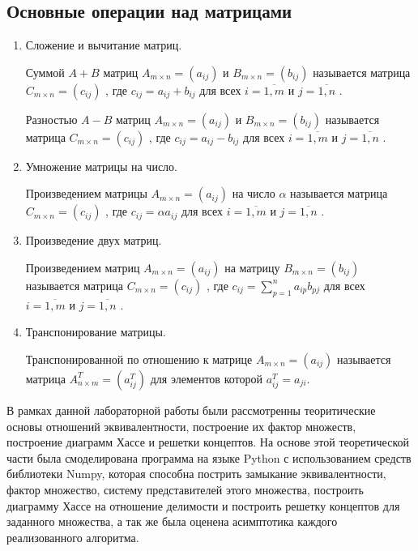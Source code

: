 \documentclass[spec, och, labwork]{shiza}
\begin{document}
    \subsection{Основные операции над матрицами}

    \begin{enumerate}
        \item Сложение и вычитание матриц.
        
        Суммой $A + B$ матриц $A_{m \times n} = (a_{ij}) \text{ и }B_{m \times n} = (b_{ij})$ называется матрица 
        $C_{m \times n} = (c_{ij})$ , где $c_{ij} = a_{ij} + b_{ij}$ для всех $i = \overline{1, m} \text{ и } j = \overline{1, n}$ .

        Разностью $A - B$ матриц $A_{m \times n} = (a_{ij}) \text{ и }B_{m \times n} = (b_{ij})$ называется матрица 
        $C_{m \times n} = (c_{ij})$ , где $c_{ij} = a_{ij} - b_{ij}$ для всех $i = \overline{1, m} \text{ и } j = \overline{1, n}$ .
        \item Умножение матрицы на число.
        
        Произведением матрицы $A_{m \times n} = (a_{ij}) \text{ на число } \alpha$ называется матрица 
        $C_{m \times n} = (c_{ij})$ , где $c_{ij} = \alpha a_{ij}$ для всех $i = \overline{1, m} \text{ и } j = \overline{1, n}$ .
        \item Произведение двух матриц.
        
        Произведением матриц $A_{m \times n} = (a_{ij}) \text{ на матрицу }B_{m \times n} = (b_{ij})$ называется матрица 
        $C_{m \times n} = (c_{ij})$ , где $c_{ij} = \sum\limits_{p=1}^n a_{ip}b_{pj}$ для всех $i = \overline{1, m} \text{ и } j = \overline{1, n}$ .
        \item Транспонирование матрицы.
        
        Транспонированной по отношению к матрице $A_{m \times n} = (a_{ij})$ называется матрица $A^T_{n \times m} = (a^T_{ij})$
        для элементов которой $a^T_{ij} = a_{ji}$.
    \end{enumerate}

\conclusion

В рамках данной лабораторной работы были рассмотренны теоритические основы  отношений эквивалентности, построение их фактор
множеств, построение диаграмм Хассе и решетки концептов. На основе этой теоретической части была смоделирована программа на языке Python с 
использованием средств библиотеки Numpy, которая способна пострить замыкание эквивалентности, фактор множество, систему представителей этого множества,
построить диаграмму Хассе на отношение делимости и построить решетку концептов для заданного множества, а так же была оценена асимптотика каждого реализованного
алгоритма.
\end{document}
